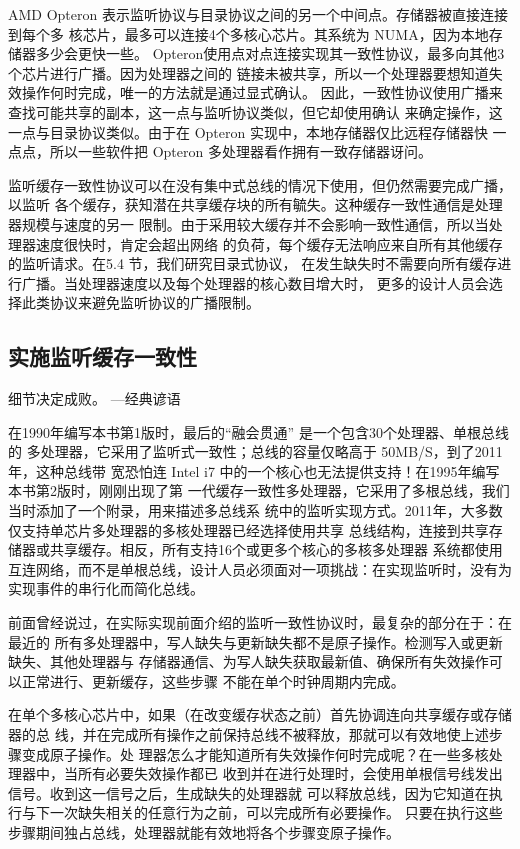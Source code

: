 AMD Opteron 表示监听协议与目录协议之间的另一个中间点。存储器被直接连接到每个多
核芯片，最多可以连接4个多核心芯片。其系统为 NUMA，因为本地存储器多少会更快一些。
Opteron使用点对点连接实现其一致性协议，最多向其他3个芯片进行广播。因为处理器之间的
链接未被共享，所以一个处理器要想知道失效操作何时完成，唯一的方法就是通过显式确认。
因此，一致性协议使用广播来查找可能共享的副本，这一点与监听协议类似，但它却使用确认
来确定操作，这一点与目录协议类似。由于在 Opteron 实现中，本地存储器仅比远程存储器快
一点点，所以一些软件把 Opteron 多处理器看作拥有一致存储器讶问。

监听缓存一致性协议可以在没有集中式总线的情况下使用，但仍然需要完成广播，以监听
各个缓存，获知潜在共享缓存块的所有毓失。这种缓存一致性通信是处理器规模与速度的另一
限制。由于采用较大缓存并不会影响一致性通信，所以当处理器速度很快时，肯定会超出网络
的负荷，每个缓存无法响应来自所有其他缓存的监听请求。在5.4 节，我们研究目录式协议，
在发生缺失时不需要向所有缓存进行广播。当处理器速度以及每个处理器的核心数目增大时，
更多的设计人员会选择此类协议来避免监听协议的广播限制。

\subsection{实施监听缓存一致性}
细节决定成败。
—经典谚语

在1990年编写本书第1版时，最后的“融会贯通” 是一个包含30个处理器、单根总线的
多处理器，它采用了监听式一致性；总线的容量仅略高于 50MB/S，到了2011年，这种总线带
宽恐怕连 Intel i7 中的一个核心也无法提供支持！在1995年编写本书第2版时，刚刚出现了第
一代缓存一致性多处理器，它采用了多根总线，我们当时添加了一个附录，用来描述多总线系
统中的监听实现方式。2011年，大多数仅支持单芯片多处理器的多核处理器已经选择使用共享
总线结构，连接到共享存储器或共享缓存。相反，所有支持16个或更多个核心的多核多处理器
系统都使用互连网络，而不是单根总线，设计人员必须面对一项挑战：在实现监听时，没有为
实现事件的串行化而简化总线。

前面曾经说过，在实际实现前面介绍的监听一致性协议时，最复杂的部分在于：在最近的
所有多处理器中，写人缺失与更新缺失都不是原子操作。检测写入或更新缺失、其他处理器与
存储器通信、为写人缺失获取最新值、确保所有失效操作可以正常进行、更新缓存，这些步骤
不能在单个时钟周期内完成。

在单个多核心芯片中，如果（在改变缓存状态之前）首先协调连向共享缓存或存储器的总
线，并在完成所有操作之前保持总线不被释放，那就可以有效地使上述步骤变成原子操作。处
理器怎么才能知道所有失效操作何时完成呢？在一些多核处理器中，当所有必要失效操作都已
收到并在进行处理时，会使用单根信号线发出信号。收到这一信号之后，生成缺失的处理器就
可以释放总线，因为它知道在执行与下一次缺失相关的任意行为之前，可以完成所有必要操作。
只要在执行这些步骤期间独占总线，处理器就能有效地将各个步骤变原子操作。

